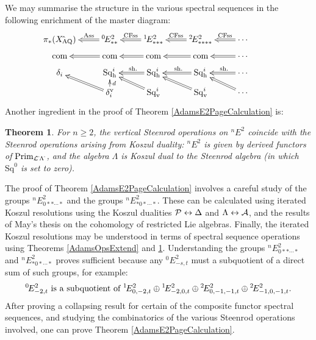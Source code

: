 \documentclass[11pt]{article}
\theoremstyle{plain}
\newtheorem{theorem}{Theorem}
\newcommand{\Sq}{\mathrm{Sq}}
\begin{document}
\noindent We may summarise the structure in the various spectral sequences in the following enrichment of the master diagram:
\[\xymatrix@R=2mm{
\pi_{*}(X{\hat{\,}_\textup{\!\!AQ}})&%
\ar@{=>}[l]_-{\textup{Ass}}
{^{0\!}}E^2_{**}&%
\ar@{=>}[l]_-{\textup{CFss}}
{^{1\!}}E^2_{***}
&%
{^{2\!}}E^2_{****}
\ar@{=>}[l]_-{\textup{CFss}}&%
\cdots
\ar@{=>}[l]_-{\textup{CFss}}%
\\
\textup{com}&
\textup{com}\ar@{=>}[l]&
\textup{com}\ar@{=>}[l]&
\textup{com}\ar@{=>}[l]&
\cdots \ar@{=>}[l]\\
\delta_i&
\Sq^i_\textup{h}&
\Sq^i_\textup{h}\ar@{=>}[l]_-{\ \textup{sh.}}&
\Sq^i_\textup{h}\ar@{=>}[l]_-{\ \textup{sh.}}&
\cdots \ar@{=>}[l]_-{\ \textup{sh.}}\\
&
\delta^\textup{v}_i\ar@{=>}[ul]\ar[u]_-d
&
\Sq_\textup{v}^i\ar@{=>}[ul]&
\Sq_\textup{v}^i\ar@{=>}[ul]&
\cdots \ar@{=>}[ul]&
}\]
Another ingredient in the proof of Theorem \ref{AdamsE2PageCalculation} is:
\begin{theorem}\label{vertSteenIsKoszul}
For $n\geq2$, the vertical Steenrod operations on ${^{n\!}}E^2$ coincide with the Steenrod operations arising from Koszul duality: %
${^{n\!}}E^2$ is given by derived functors of $\textup{Prim}_{\mathcal{L}{\hat{\,}}\Lambda{\hat{\,}}}$, and the algebra $\Lambda$ is Koszul dual to the Steenrod algebra (in which $\Sq^0$ is set to zero).
\end{theorem}
\noindent The proof of Theorem \ref{AdamsE2PageCalculation} involves a careful study of the groups ${^{n\!}}E^2_{0**\cdots *}$ and the groups ${^{n\!}}E^2_{*0*\cdots *}$. These can be calculated using iterated Koszul resolutions using the Koszul dualities $\mathcal{P}\leftrightarrow\Delta$ and $\Lambda\leftrightarrow\mathcal{A}$, and the results of May's thesis \cite{MayRestLie.pdf} on the cohomology of restricted Lie algebras. Finally, the iterated Koszul resolutions may be understood in terms of spectral sequence operations using Theorems \ref{AdamsOpsExtend} and \ref{vertSteenIsKoszul}. Understanding the groups ${^{n\!}}E^2_{0**\cdots *}$ and ${^{n\!}}E^2_{*0*\cdots *}$ proves sufficient because any ${^{0\!}}E^2_{-s,t}$ must a subquotient of a direct sum of such groups, for example:
\[{^{0\!}}E^2_{-2,t}\textup{ is a subquotient of }{^{1\!}}E^2_{0,-2,t}\oplus {^{1\!}}E^2_{-2,0,t}\oplus {^{2\!}}E^2_{0,-1,-1,t}\oplus {^{2\!}}E^2_{-1,0,-1,t}.\]
After proving a collapsing result for certain of the composite functor spectral sequences, and studying the combinatorics of the various Steenrod operations involved, one can prove Theorem \ref{AdamsE2PageCalculation}.
\end{document}
